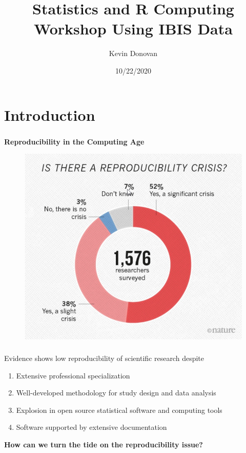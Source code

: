\documentclass[xcolor=dvipsnames]{beamer}
\title[Intro to Stats and R]{Statistics and R Computing Workshop Using IBIS Data}
\author[Kevin Donovan]{Kevin Donovan}
\institute[UNC and IBIS]{UNC-Chapel Hill and IBIS Network}
\date[10/22/2020]{10/22/2020}
\begin{document}
\begin{frame}
	\titlepage
\end{frame}

\section{Introduction}
\begin{frame}
\frametitle{\insertsectionhead}
\textbf{Reproducibility in the Computing Age}
\begin{figure}
\includegraphics[scale=0.45]{images/reproducibility.png}
\end{figure}
\end{frame}

\begin{frame}
\frametitle{\insertsectionhead}
Evidence shows low reproducibility of scientific research despite
\begin{enumerate}
\item Extensive professional specialization
\item Well-developed methodology for study design and data analysis
\item Explosion in open source statistical software and computing tools
\item Software supported by extensive documentation
\end{enumerate}
\textbf{How can we turn the tide on the reproducibility issue?}
\end{frame}
\end{document}
